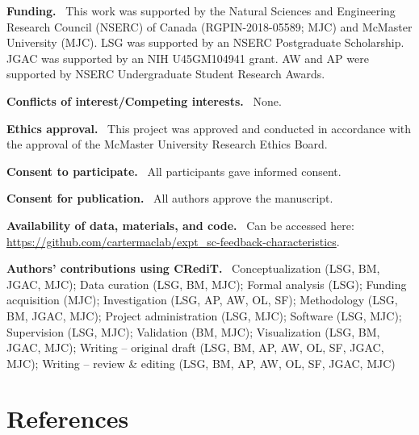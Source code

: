 \documentclass[
  doc, donotrepeattitle,floatsintext]{apa7}
\begin{document}
\noindent
\textbf{Funding.} ~This work was supported by the Natural Sciences and Engineering Research Council (NSERC) of Canada (RGPIN-2018-05589; MJC) and McMaster University (MJC). LSG was supported by an NSERC Postgraduate Scholarship. JGAC was supported by an NIH U45GM104941 grant. AW and AP were supported by NSERC Undergraduate Student Research Awards.

\noindent
\textbf{Conflicts of interest/Competing interests.} ~None.

\noindent
\textbf{Ethics approval.} ~This project was approved and conducted in accordance with the approval of the McMaster University Research Ethics Board.

\noindent
\textbf{Consent to participate.} ~All participants gave informed consent.

\noindent
\textbf{Consent for publication.} ~All authors approve the manuscript.

\noindent
\textbf{Availability of data, materials, and code.} ~Can be accessed here: \url{https://github.com/cartermaclab/expt_sc-feedback-characteristics}.

\noindent
\textbf{Authors' contributions using CRediT.} ~Conceptualization (LSG, BM, JGAC, MJC); Data curation (LSG, BM, MJC); Formal analysis (LSG); Funding acquisition (MJC); Investigation (LSG, AP, AW, OL, SF); Methodology (LSG, BM, JGAC, MJC); Project administration (LSG, MJC); Software (LSG, MJC); Supervision (LSG, MJC); Validation (BM, MJC); Visualization (LSG, BM, JGAC, MJC); Writing -- original draft (LSG, BM, AP, AW, OL, SF, JGAC, MJC); Writing -- review \& editing (LSG, BM, AP, AW, OL, SF, JGAC, MJC)

\hypertarget{references}{%
\section{References}\label{references}}

\vspace{2ex}
\end{document}
